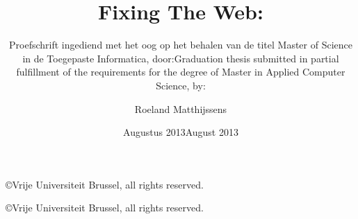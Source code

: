 \documentclass[a4paper,11pt, twoside, openright]{book}
\author{Roeland Matthijssens}
\title{Fixing The Web: }
\subtitle{Proefschrift ingediend met het oog op het behalen van de titel Master of Science in de Toegepaste Informatica, door:}
\date{Augustus 2013}
\numberwithin{figure}{chapter}
\begin{document}
\pagestyle{fancy}
\setlength{\headheight}{14pt}
\renewcommand{\chaptermark}[1]{\markboth{\MakeUppercase{\chaptername}\ \thechapter.\ #1}{}}
\renewcommand{\sectionmark}[1]{\markright{#1}{}}
\fancyhf{}
\fancyhead[LO,RE]{\bfseries\thepage}
\fancyhead[RO]{\bfseries\leftmark}
\fancyhead[LE]{\bfseries\rightmark}
\renewcommand{\headrulewidth}{0pt}


\setlength{\parskip}{0pt} %
\setlength{\parindent}{0pt}

%
%


\vubtheses

\pagebreak

\thispagestyle{empty}
\vspace*{\fill}
\begin{center}
\copyright Vrije Universiteit Brussel, all rights reserved.
\end{center}

\pagebreak

\subtitle{Graduation thesis submitted in partial fulfillment of the requirements for the degree of \newline Master in Applied Computer Science, by: }
\date{August 2013}

\vubthesesen

\pagebreak

\thispagestyle{empty}
\vspace*{\fill}
\begin{center}
\copyright Vrije Universiteit Brussel, all rights reserved.
\end{center}

\pagebreak


\makeatletter\@openrightfalse

%
%
\pagestyle{empty}
\pagebreak
\newpage

\@openrighttrue\makeatother

%
%

\newpage
\pagestyle {fancy}
\tableofcontents
\pagebreak
\thispagestyle{plain}

\makeatletter
\renewcommand*\cleardoublepage{\clearpage\if@twoside %
  \ifodd\c@page \hbox{}\newpage\if@twocolumn\hbox{}%
  \newpage\fi\fi\fi}
\makeatother

\setcounter{page}{1}

%
%










%
%

\newpage


\end{document}
